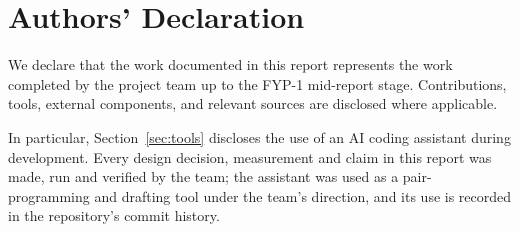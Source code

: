 \chapter*{Authors' Declaration}
We declare that the work documented in this report represents the work completed by the project team up to the FYP-1 mid-report stage. Contributions, tools, external components, and relevant sources are disclosed where applicable.

In particular, Section~\ref{sec:tools} discloses the use of an AI coding assistant during development. Every design decision, measurement and claim in this report was made, run and verified by the team; the assistant was used as a pair-programming and drafting tool under the team's direction, and its use is recorded in the repository's commit history.
